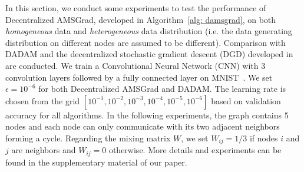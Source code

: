\documentclass{article} %
\begin{document}
In this section, we conduct some experiments to test the performance of Decentralized AMSGrad, developed in Algorithm~\ref{alg: damsgrad}, on both \emph{homogeneous} data and \emph{heterogeneous} data distribution (i.e. the data generating distribution on different nodes are assumed to be different). 
Comparison with DADAM and the decentralized stochastic gradient descent (DGD) developed in~\citet{lian2017can} are conducted. 
We train a Convolutional Neural Network (CNN) with 3 convolution layers followed by a fully connected layer on MNIST~\citep{lecun1998mnist}.
We set $\epsilon = 10^{-6}$ for both Decentralized AMSGrad and DADAM.
The learning rate is chosen from the grid $[10^{-1}, 10^{-2}, 10^{-3}, 10^{-4}, 10^{-5}, 10^{-6}]$ based on validation accuracy for all algorithms. 
In the following experiments, the graph contains 5 nodes and each node can only communicate with its two adjacent neighbors forming a cycle.
Regarding the mixing matrix $W$, we set $W_{ij} = 1/3$ if nodes $i$ and $j$ are neighbors and $W_{ij} = 0$ otherwise.
More details and experiments can be found in the supplementary material of our paper.\vspace{-0.05in}
\end{document}

